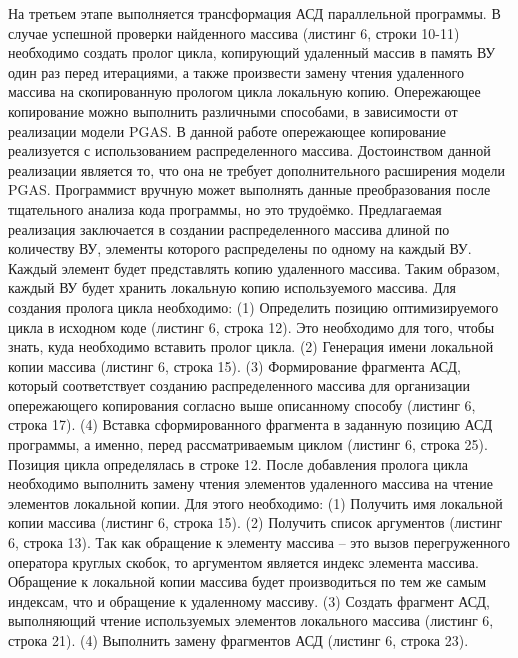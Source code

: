 На третьем этапе выполняется трансформация АСД параллельной программы. В случае успешной проверки найденного массива (листинг 6, строки 10-11) необходимо создать пролог цикла, копирующий удаленный массив в память ВУ один раз перед итерациями, а также произвести замену чтения удаленного массива на скопированную прологом цикла локальную копию. Опережающее копирование можно выполнить различными способами, в зависимости от реализации модели PGAS. В данной работе опережающее копирование реализуется с использованием распределенного массива. Достоинством данной реализации является то, что она не требует дополнительного расширения модели PGAS. Программист вручную может выполнять данные преобразования после тщательного анализа кода программы, но это трудоёмко.
Предлагаемая реализация заключается в создании распределенного массива длиной по количеству ВУ, элементы которого распределены по одному на каждый ВУ. Каждый элемент будет представлять копию удаленного массива. Таким образом, каждый ВУ будет хранить локальную копию используемого массива.
Для создания пролога цикла необходимо:
(1)	Определить позицию оптимизируемого цикла в исходном коде (листинг 6, строка 12). Это необходимо для того, чтобы знать, куда необходимо вставить пролог цикла.
(2)	Генерация имени локальной копии массива (листинг 6, строка 15).
(3)	Формирование фрагмента АСД, который соответствует созданию распределенного массива для организации опережающего копирования согласно выше описанному способу (листинг 6, строка 17).
(4)	Вставка сформированного фрагмента в заданную позицию АСД программы, а именно, перед рассматриваемым циклом (листинг 6, строка 25). Позиция цикла определялась в строке 12.
После добавления пролога цикла необходимо выполнить замену чтения элементов удаленного массива на чтение элементов локальной копии. Для этого необходимо: 
(1)	Получить имя локальной копии массива (листинг 6, строка 15).
(2)	Получить список аргументов (листинг 6, строка 13). Так как обращение к элементу массива – это вызов перегруженного оператора круглых скобок, то аргументом является индекс элемента массива. Обращение к локальной копии массива будет производиться по тем же самым индексам, что и обращение к удаленному массиву.
(3)	Создать фрагмент АСД, выполняющий чтение используемых элементов локального массива (листинг 6, строка 21).
(4)	Выполнить замену фрагментов АСД (листинг 6, строка 23).

